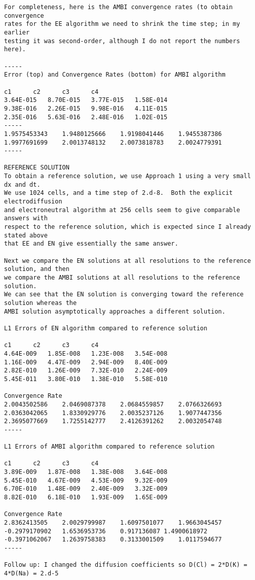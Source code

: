 \documentclass[final]{siamltex}
\begin{document}
\begin{verbatim}
For completeness, here is the AMBI convergence rates (to obtain convergence 
rates for the EE algorithm we need to shrink the time step; in my earlier 
testing it was second-order, although I do not report the numbers here).

-----
Error (top) and Convergence Rates (bottom) for AMBI algorithm

c1		c2		c3		c4
3.64E-015	8.70E-015	3.77E-015	1.58E-014
9.38E-016	2.26E-015	9.98E-016	4.11E-015
2.35E-016	5.63E-016	2.48E-016	1.02E-015
-----			
1.9575453343	1.9480125666	1.9198041446	1.9455387386
1.9977691699	2.0013748132	2.0073818783	2.0024779391
-----

REFERENCE SOLUTION
To obtain a reference solution, we use Approach 1 using a very small dx and dt.
We use 1024 cells, and a time step of 2.d-8.  Both the explicit electrodiffusion
and electroneutral algorithm at 256 cells seem to give comparable answers with
respect to the reference solution, which is expected since I already stated above
that EE and EN give essentially the same answer.

Next we compare the EN solutions at all resolutions to the reference solution, and then
we compare the AMBI solutions at all resolutions to the reference solution.
We can see that the EN solution is converging toward the reference solution whereas the
AMBI solution asymptotically approaches a different solution.

L1 Errors of EN algorithm compared to reference solution

c1		c2		c3		c4
4.64E-009	1.85E-008	1.23E-008	3.54E-008
1.16E-009	4.47E-009	2.94E-009	8.40E-009
2.82E-010	1.26E-009	7.32E-010	2.24E-009
5.45E-011	3.80E-010	1.38E-010	5.58E-010
			
Convergence Rate			
2.0043502586	2.0469087378	2.0684559857	2.0766326693
2.0363042065	1.8330929776	2.0035237126	1.9077447356
2.3695077669	1.7255142777	2.4126391262	2.0032054748
-----

L1 Errors of AMBI algorithm compared to reference solution

c1		c2		c3		c4
3.89E-009	1.87E-008	1.38E-008	3.64E-008
5.45E-010	4.67E-009	4.53E-009	9.32E-009
6.70E-010	1.48E-009	2.40E-009	3.32E-009
8.82E-010	6.18E-010	1.93E-009	1.65E-009
			
Convergence Rate		
2.8362413505	2.0029799987	1.6097501077	1.9663045457
-0.2979170902	1.6536953736	0.917136087	1.4900618972
-0.3971062067	1.2639758383	0.3133001509	1.0117594677
-----

Follow up: I changed the diffusion coefficients so D(Cl) = 2*D(K) = 4*D(Na) = 2.d-5


\end{verbatim}
\end{document}
